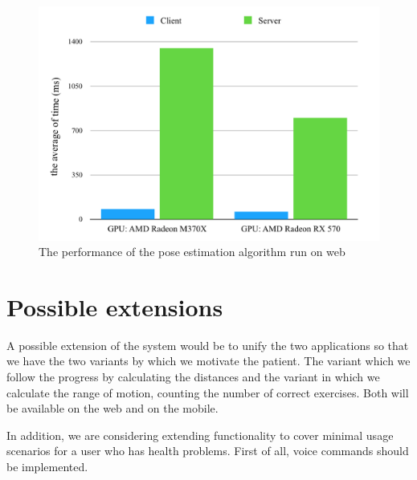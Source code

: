  \begin{figure}[htbp]
	\centerline{\includegraphics[scale=0.7]{fig/web-performace.png}}  
	\caption{The performance of the pose estimation algorithm run on web}
	\label{fig:web-perf}
\end{figure}

\section{Possible extensions}

A possible extension of the system would be to unify the two applications so that we have the two variants by which we motivate the patient. The variant which we follow the progress by calculating the distances and the variant in which we calculate the range of motion, counting the number of correct exercises.
Both will be available on the web and on the mobile.

In addition, we are considering extending functionality to cover minimal usage scenarios for a user who has health problems. First of all, voice commands should be implemented.

